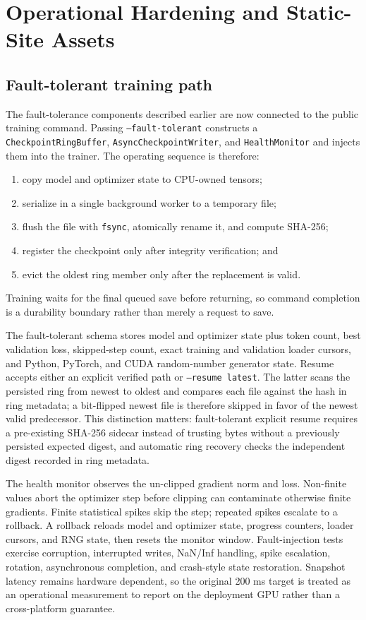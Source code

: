 \documentclass[11pt,a4paper]{article}
\theoremstyle{definition}
\theoremstyle{plain}
\begin{document}
\section{Operational Hardening and Static-Site Assets}

\subsection{Fault-tolerant training path}

The fault-tolerance components described earlier are now connected to the public
training command.  Passing \texttt{--fault-tolerant} constructs a
\texttt{CheckpointRingBuffer}, \texttt{AsyncCheckpointWriter}, and
\texttt{HealthMonitor} and injects them into the trainer.  The operating sequence is
therefore:
\begin{enumerate}
    \item copy model and optimizer state to CPU-owned tensors;
    \item serialize in a single background worker to a temporary file;
    \item flush the file with \texttt{fsync}, atomically rename it, and compute SHA-256;
    \item register the checkpoint only after integrity verification; and
    \item evict the oldest ring member only after the replacement is valid.
\end{enumerate}
Training waits for the final queued save before returning, so command completion is a
durability boundary rather than merely a request to save.

The fault-tolerant schema stores model and optimizer state plus token count, best
validation loss, skipped-step count, exact training and validation loader cursors,
and Python, PyTorch, and CUDA random-number generator state.  Resume accepts either
an explicit verified path or
\texttt{--resume latest}.  The latter scans the persisted ring from newest to oldest
and compares each file against the hash in ring metadata; a bit-flipped newest file is
therefore skipped in favor of the newest valid predecessor.  This distinction matters:
fault-tolerant explicit resume requires a pre-existing SHA-256 sidecar instead of
trusting bytes without a previously persisted expected digest, and automatic ring
recovery checks the independent digest recorded in ring metadata.

The health monitor observes the un-clipped gradient norm and loss.  Non-finite values
abort the optimizer step before clipping can contaminate otherwise finite gradients.
Finite statistical spikes skip the step; repeated spikes escalate to a rollback.  A
rollback reloads model and optimizer state, progress counters, loader cursors, and RNG
state, then resets the monitor window.  Fault-injection tests exercise corruption,
interrupted
writes, NaN/Inf handling, spike escalation, rotation, asynchronous completion, and
crash-style state restoration.  Snapshot latency remains hardware dependent, so the
original 200 ms target is treated as an operational measurement to report on the
deployment GPU rather than a cross-platform guarantee.
\end{document}
